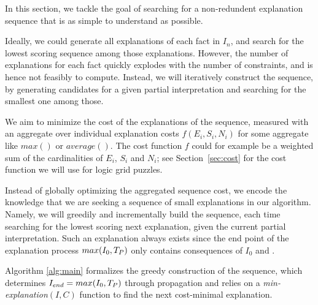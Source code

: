In this section, we tackle the goal of searching for a non-redundent explanation sequence that is as simple to understand as possible. 

Ideally, we could generate all explanations of each fact in $I_n$, and search for the lowest scoring sequence among those explanations. However, the number of explanations for each fact quickly explodes with the number of constraints, and is hence not feasibly to compute. Instead, we will iteratively construct the sequence, by generating candidates for a given partial interpretation and searching for the smallest one among those.

We aim to minimize the cost of the explanations of the sequence, measured with an aggregate over individual explanation costs $f(E_i, S_i, N_i)$ for some aggregate like $max()$ or $average()$. The cost function $f$ could for example be a weighted sum of the cardinalities of $E_i$, $S_i$ and $N_i$; see Section~\ref{sec:cost} for the cost function we will use for logic grid puzzles.

Instead of globally optimizing the aggregated sequence cost, we encode the knowledge that we are seeking a sequence of small explanations in our algorithm. Namely, we will greedily and incrementally build the sequence, each time searching for the lowest scoring next explanation, given the current partial interpretation. Such an explanation always exists since the end point of the explanation process $max(I_0,T_P)$ only contains consequences of $I_0$ and \allconstraints. 

Algorithm \ref{alg:main} formalizes the greedy construction of the sequence, which determines $I_{end} = max(I_0,T_P)$  through propagation and relies on a \textit{min-explanation$(I,C)$} function to find the next cost-minimal explanation. %

